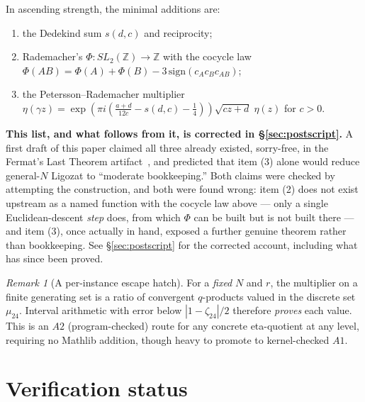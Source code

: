 \documentclass[11pt, a4paper]{article}
\theoremstyle{remark}
\newtheorem{remark}[theorem]{Remark}
\begin{document}
In ascending strength, the minimal additions are:
\begin{enumerate}[label=(\arabic*)]
  \item the Dedekind sum $s(d,c)$ and reciprocity;
  \item Rademacher's $\Phi : SL_2(\mathbb{Z})\to\mathbb{Z}$ with the cocycle law
        $\Phi(AB) = \Phi(A)+\Phi(B)-3\,\mathrm{sign}(c_A c_B c_{AB})$;
  \item the Petersson--Rademacher multiplier
        $\eta(\gamma z) = \exp\!\left(\pi i\left(\tfrac{a+d}{12c} - s(d,c) - \tfrac14\right)\right)\sqrt{cz+d}\;\eta(z)$
        for $c>0$.
\end{enumerate}
\textbf{This list, and what follows from it, is corrected in \S\ref{sec:postscript}.} A first draft
of this paper claimed all three already existed, sorry-free, in the Fermat's Last Theorem
artifact~\cite{FLT2026}, and predicted that item (3) alone would reduce general-$N$ Ligozat to
``moderate bookkeeping.'' Both claims were checked by attempting the construction, and both were
found wrong: item (2) does not exist upstream as a named function with the cocycle law above ---
only a single Euclidean-descent \emph{step} does, from which $\Phi$ can be built but is not built
there --- and item (3), once actually in hand, exposed a further genuine theorem rather than
bookkeeping. See \S\ref{sec:postscript} for the corrected account, including what has since been
proved.

\begin{remark}[A per-instance escape hatch]
For a \emph{fixed} $N$ and $r$, the multiplier on a finite generating set is a ratio of convergent
$q$-products valued in the discrete set $\mu_{24}$. Interval arithmetic with error below
$|1-\zeta_{24}|/2$ therefore \emph{proves} each value. This is an $A2$ (program-checked) route for
any concrete eta-quotient at any level, requiring no Mathlib addition, though heavy to promote to
kernel-checked $A1$.
\end{remark}

\section{Verification status}\label{sec:verification}
\end{document}
